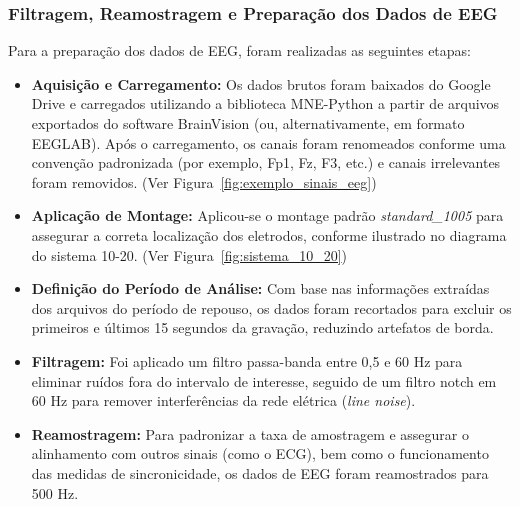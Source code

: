 \subsubsection{Filtragem, Reamostragem e Preparação dos Dados de EEG}
Para a preparação dos dados de EEG, foram realizadas as seguintes etapas:
\begin{itemize}
    \item \textbf{Aquisição e Carregamento:} Os dados brutos foram baixados do Google Drive e carregados utilizando a biblioteca MNE-Python a partir de arquivos exportados do software BrainVision (ou, alternativamente, em formato EEGLAB). Após o carregamento, os canais foram renomeados conforme uma convenção padronizada (por exemplo, Fp1, Fz, F3, etc.) e canais irrelevantes foram removidos. (Ver Figura~\ref{fig:exemplo_sinais_eeg})
    \item \textbf{Aplicação de Montage:} Aplicou-se o montage padrão \textit{standard\_1005} para assegurar a correta localização dos eletrodos, conforme ilustrado no diagrama do sistema 10-20. (Ver Figura~\ref{fig:sistema_10_20})
    \item \textbf{Definição do Período de Análise:} Com base nas informações extraídas dos arquivos do período de repouso, os dados foram recortados para excluir os primeiros e últimos 15 segundos da gravação, reduzindo artefatos de borda.
    \item \textbf{Filtragem:} Foi aplicado um filtro passa-banda entre 0,5 e 60 Hz para eliminar ruídos fora do intervalo de interesse, seguido de um filtro notch em 60 Hz para remover interferências da rede elétrica (\textit{line noise}).
    \item \textbf{Reamostragem:} Para padronizar a taxa de amostragem e assegurar o alinhamento com outros sinais (como o ECG), bem como o funcionamento das medidas de sincronicidade, os dados de EEG foram reamostrados para 500 Hz.
\end{itemize}


